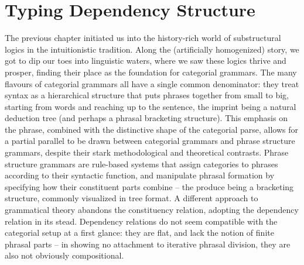 \chapter{Typing Dependency Structure}
\label{chapter:chapter_2}


The previous chapter initiated us into the history-rich world of substructural logics in the intuitionistic tradition.
Along the (artificially homogenized) story, we got to dip our toes into linguistic waters, where we saw these logics thrive and prosper, finding their place as the foundation for categorial grammars.
The many flavours of categorial grammars all have a single common denominator: they treat syntax as a hierarchical structure that puts phrases together from small to big, starting from words and reaching up to the sentence, the imprint being a natural deduction tree (and perhaps a phrasal bracketing structure).
This emphasis on the phrase, combined with the distinctive shape of the categorial parse, allows for a partial parallel to be drawn between categorial grammars and phrase structure grammars, despite their stark methodological and theoretical contrasts.
Phrase structure grammars are rule-based systems that assign categories to phrases according to their syntactic function, and manipulate phrasal formation by specifying how their constituent parts combine -- the produce being a bracketing structure, commonly visualized in tree format.
A different approach to grammatical theory abandons the constituency relation, adopting the dependency relation in its stead.
Dependency relations do not seem compatible with the categorial setup at a first glance: they are flat, and lack the notion of finite phrasal parts -- in showing no attachment to iterative phrasal division, they are also not obviously compositional.

